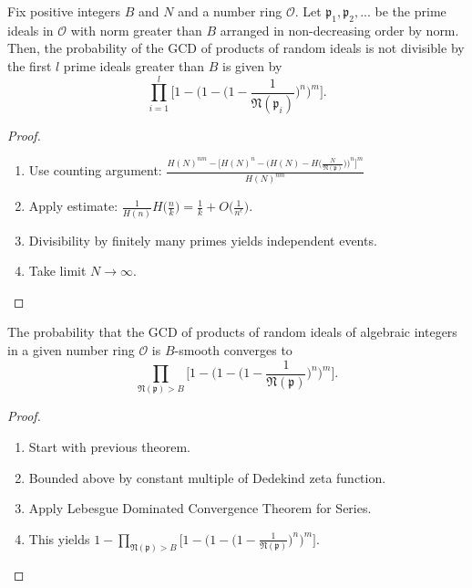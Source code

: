 \documentclass[11pt,xcolor={dvipsnames}]{beamer}
\newcommand{\f}[1]{\mathfrak{#1}}
\begin{document}
	\begin{frame}
	\begin{theorem}
		Fix positive integers $B$ and $N$ and a number ring $\mathcal{O}$. Let $\mathfrak{p}_1, \mathfrak{p}_2, ...$ be the prime ideals in $\mathcal{O}$ with norm greater than $B$ arranged in non-decreasing order by norm. Then, the probability of the GCD of products of random ideals is not divisible by the first $l$ prime ideals greater than $B$ is given by 
		$$\prod_{i=1}^{l} \Big[1 - \Big(1 - \Big(1-\frac{1}{\mathfrak{N}(\mathfrak{p}_i)}\Big)^n\Big)^m\Big].$$
	\end{theorem}
	
	\begin{proof}
		\begin{enumerate}
			\item Use counting argument: $\frac{H(N)^{nm}-\Big[H(N)^n - \Big(H(N) - H\Big(\frac{N}{\f{N(p)}}\Big)\Big)^n\Big]^m}{H(N)^{nm}}$
			\item Apply estimate: $\frac{1}{H(n)} H\Big(\frac{n}{k}\Big) = \frac{1}{k} + O\Big(\frac{1}{n^{\epsilon}}\Big).$
			\item Divisibility by finitely many primes yields independent events.
			\item Take limit $N \to \infty$.
		\end{enumerate}
	\end{proof}
\end{frame}

\begin{frame}
	\begin{theorem}
		The probability that the GCD of products of random ideals of algebraic integers in a given number ring $\mathcal{O}$ is $B$-smooth converges to
		$$\prod_{\f{N}(\f{p})>B}\Big[1 - \Big(1 - \Big(1 - \frac{1}{\f{N}(\f{p})}\Big)^n \Big)^m \Big].$$
	\end{theorem}
	\begin{proof}
		\begin{enumerate}
			\item Start with previous theorem.
                \item Bounded above by constant multiple of Dedekind zeta function.
			\item Apply Lebesgue Dominated Convergence Theorem for Series.
				\item This yields $1 - \prod_{\mathfrak{N}(\mathfrak{p}) > B} \Big[1 - \Big(1 - \Big(1 - \frac{1}{\mathfrak{N}(\mathfrak{p})}  \Big)^n\Big)^m\Big].$
		\end{enumerate}
	\end{proof}
\end{frame}
\end{document}
